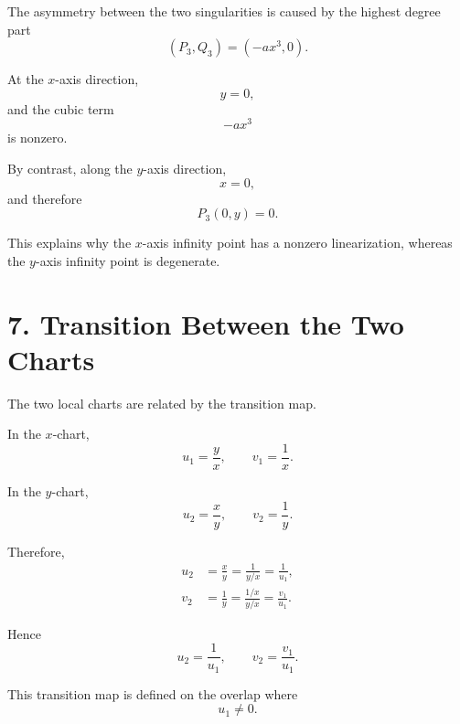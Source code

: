 \documentclass[11pt,a4paper]{article}
\begin{document}
The asymmetry between the two singularities is caused by the highest
degree part
\begin{equation}
(P_3,Q_3)=(-ax^3,0).
\end{equation}

At the $x$-axis direction,
\begin{equation}
y=0,
\end{equation}
and the cubic term
\begin{equation}
-ax^3
\end{equation}
is nonzero.

By contrast, along the $y$-axis direction,
\begin{equation}
x=0,
\end{equation}
and therefore
\begin{equation}
P_3(0,y)=0.
\end{equation}

This explains why the $x$-axis infinity point has a nonzero
linearization, whereas the $y$-axis infinity point is degenerate.

\section{7. Transition Between the Two Charts}

The two local charts are related by the transition map.

In the $x$-chart,
\begin{equation}
u_1=\frac{y}{x},
\qquad
v_1=\frac1x.
\end{equation}

In the $y$-chart,
\begin{equation}
u_2=\frac{x}{y},
\qquad
v_2=\frac1y.
\end{equation}

Therefore,
\begin{align}
u_2
&=
\frac{x}{y}
=
\frac{1}{y/x}
=
\frac1{u_1},
\\
v_2
&=
\frac1y
=
\frac{1/x}{y/x}
=
\frac{v_1}{u_1}.
\end{align}

Hence
\begin{equation}
\boxed{
u_2=\frac1{u_1},
\qquad
v_2=\frac{v_1}{u_1}.
}
\tag{45}
\end{equation}

This transition map is defined on the overlap where
\begin{equation}
u_1\neq0.
\end{equation}
\end{document}
